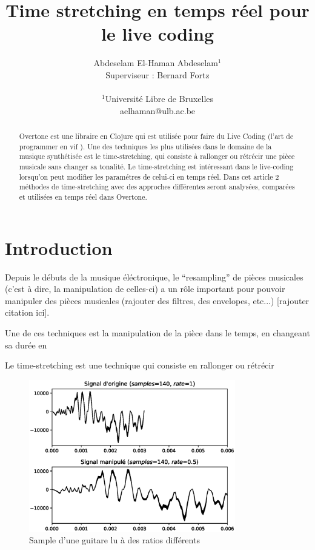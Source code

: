 \documentclass[letterpaper]{article}
\title{Time stretching en temps réel pour le live coding}
\author{Abdeselam El-Haman Abdeselam$^{1}$\\
Superviseur : Bernard Fortz
\mbox{}\\\\
$^1$Université Libre de Bruxelles \\
aelhaman@ulb.ac.be}
\begin{document}
\maketitle

\begin{abstract}
  Overtone est une libraire en Clojure qui est utilisée pour faire du
  Live Coding (l'art de programmer en \og vif \fg{}). Une des techniques les
  plus utilisées dans le domaine de la musique synthétisée est le
  time-stretching, qui consiste à rallonger ou rétrécir une pièce musicale
  sans changer sa tonalité. Le time-stretching est intéressant dans
  le live-coding lorsqu'on peut modifier les paramétres de celui-ci
  en temps réel. Dans cet article 2 méthodes de time-stretching avec des
  approches différentes seront analysées, comparées et utilisées en temps
  réel dans Overtone.

\end{abstract}

\section{Introduction}

  Depuis le débuts de la musique éléctronique, le ``resampling'' de pièces musicales
  (c'est à dire, la manipulation de celles-ci) a un rôle important pour pouvoir manipuler
  des pièces musicales (rajouter des filtres, des envelopes, etc...) [rajouter citation ici].

  Une de ces techniques est la manipulation de la pièce dans le temps, en changeant sa durée
  en

  Le time-stretching est une technique qui consiste en rallonger ou
  rétrécir 

  \begin{figure}[h]
    \centerline{\includegraphics[width=9cm]{res/fig1.eps}}
    \caption{\label{fig:guitar-stretch}Sample d'une guitare lu à des ratios différents}
  \end{figure}
  
\end{document}
